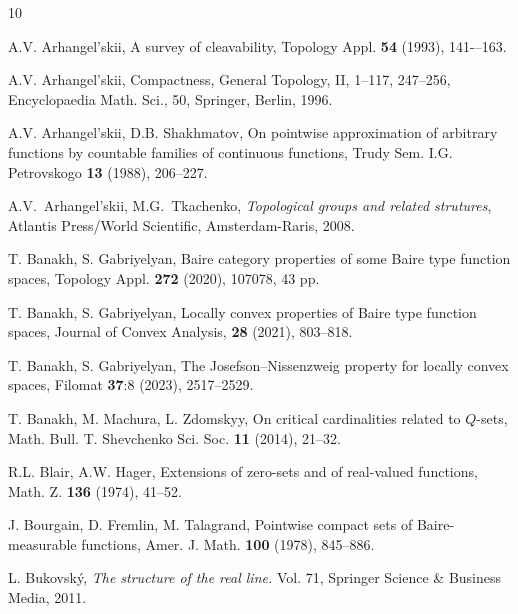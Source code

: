 \documentclass[preprint,11pt]{elsarticle}
\numberwithin{equation}{section}
\numberwithin{theorem}{section}
\begin{document}

\begin{thebibliography}{10}





%


A.V. Arhangel’skii, A survey of cleavability, Topology Appl. \textbf{54} (1993), 141-–163.

A.V. Arhangel’skii, Compactness, General Topology, II, 1–117, 247--256, Encyclopaedia Math. Sci., 50, Springer, Berlin, 1996.

A.V. Arhangel’skii, D.B. Shakhmatov, On pointwise approximation of arbitrary functions by countable families of continuous functions, Trudy Sem. I.G. Petrovskogo \textbf{13} (1988), 206--227.

A.V.~Arhangel'skii, M.G.~Tkachenko, \emph{Topological groups and related strutures}, Atlantis Press/World Scientific, Amsterdam-Raris, 2008.



T. Banakh, S. Gabriyelyan,  Baire category properties of some Baire type function spaces, Topology Appl. \textbf{272} (2020), 107078, 43 pp.

T. Banakh, S. Gabriyelyan, Locally convex properties of Baire type function spaces, Journal of Convex Analysis,  \textbf{28} (2021), 803--818.

T. Banakh, S. Gabriyelyan, The Josefson--Nissenzweig property for locally convex spaces, Filomat \textbf{37}:8 (2023),  2517--2529.

T. Banakh, M. Machura, L. Zdomskyy,  On critical cardinalities related to $Q$-sets, Math. Bull.  T. Shevchenko Sci. Soc. \textbf{11} (2014), 21--32.

R.L. Blair, A.W. Hager, Extensions of zero-sets and of real-valued functions, Math. Z. \textbf{136} (1974), 41--52.

J. Bourgain, D. Fremlin, M. Talagrand, Pointwise compact sets of Baire-measurable functions,  Amer. J. Math. \textbf{100} (1978), 845--886.

L. Bukovsk\'y,  {\em The structure of the real line.} Vol. 71, Springer Science \& Business Media, 2011.


\end{thebibliography}
\end{document}
